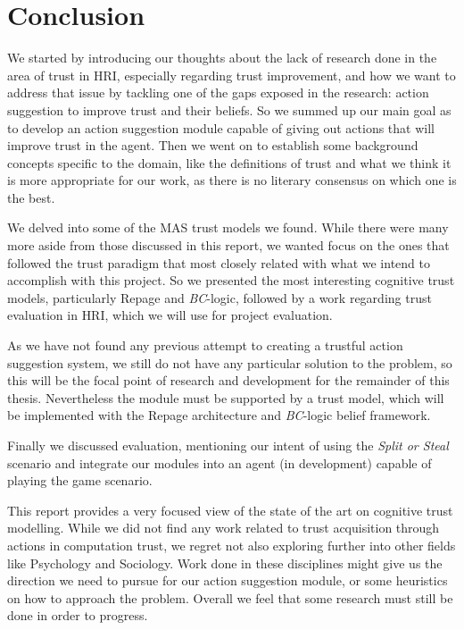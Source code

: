 \section{Conclusion}
\label{sec:Conclusion}
We started by introducing our thoughts about the lack of research done in the area of trust in \ac{HRI}, especially regarding trust improvement, and how we want to address that issue by tackling one of the gaps exposed in the research: action suggestion to improve trust and their beliefs. So we summed up our main goal as to develop an action suggestion module capable of giving out actions that will improve trust in the agent. Then we went on to establish some background concepts specific to the domain, like the definitions of trust and what we think it is more appropriate for our work, as there is no literary consensus on which one is the best. 

We delved into some of the \ac{MAS} trust models we found. While there were many more aside from those discussed in this report, we wanted focus on the ones that followed the trust paradigm that most closely related with what we intend to accomplish with this project. So we presented the most interesting cognitive trust models, particularly Repage and \textit{BC}-logic, followed by a work regarding trust evaluation in \ac{HRI}, which we will use for project evaluation.

As we have not found any previous attempt to creating a trustful action suggestion system, we still do not have any particular solution to the problem, so this will be the focal point of research and development for the remainder of this thesis. Nevertheless the module must be supported by a trust model, which will be implemented with the Repage architecture and \textit{BC}-logic belief framework.

Finally we discussed evaluation, mentioning our intent of using the \textit{Split or Steal} scenario and integrate our modules into an agent (in development) capable of playing the game scenario.

This report provides a very focused view of the state of the art on cognitive trust modelling. While we did not find any work related to trust acquisition through actions in computation trust, we regret not also exploring further into other fields like Psychology and Sociology. Work done in these disciplines might give us the direction we need to pursue for our action suggestion module, or some heuristics on how to approach the problem. Overall we feel that some research  must still be done in order to progress.